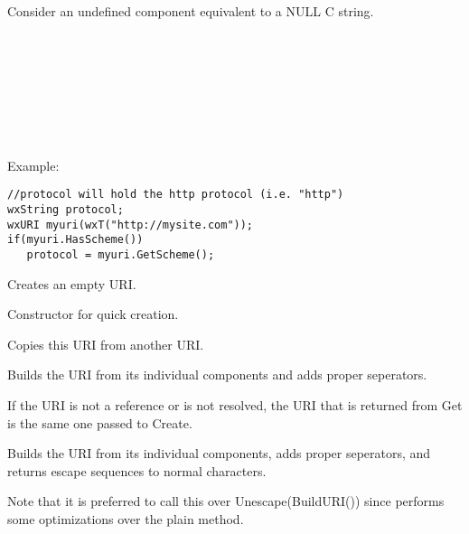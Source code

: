 Consider an undefined component equivalent to a 
NULL C string.\\
\\ 
\\
\\
\\
\\
\\
\\

Example:
\begin{verbatim}
//protocol will hold the http protocol (i.e. "http")
wxString protocol;
wxURI myuri(wxT("http://mysite.com"));
if(myuri.HasScheme())
   protocol = myuri.GetScheme();
\end{verbatim}

\label{wxuriwxuri}


Creates an empty URI.


Constructor for quick creation.



Copies this URI from another URI.



\label{wxuribuilduri}


Builds the URI from its individual components and adds proper seperators.

If the URI is not a reference or is not resolved, 
the URI that is returned from Get is the same one 
passed to Create.


\label{wxuribuildunescapeduri}


Builds the URI from its individual components, adds proper seperators, and
returns escape sequences to normal characters.

Note that it is preferred to call this over Unescape(BuildURI()) since
 performs some optimizations over the plain method.


